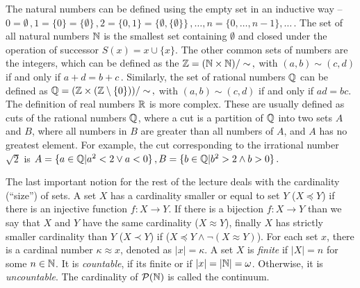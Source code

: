 The natural numbers can be defined using the empty set in an inductive way -- $0 = \emptyset\,,1=\{0\} = \{\emptyset\}\,, 2=\{0,1\} = \{\emptyset, \{\emptyset\}\}\,, \dots, n=\{0, \dots, n-1\}, \dots\,.$ The set of all natural numbers $\mathbb{N}$ is the smallest set containing $\emptyset$ and closed under the operation of successor $S(x) = x \cup \{x\}$. The other common sets of numbers are the integers, which can be defined as the $\mathbb{Z} = (\mathbb{N} \times \mathbb{N})/\sim\,,$ with $(a,b) \sim (c,d)$ if and only if $a + d = b + c\,.$ Similarly, the set of rational numbers $\mathbb{Q}$ can be defined as $\mathbb{Q} = (\mathbb{Z} \times (\mathbb{Z} \setminus \{0\}))/\sim\,,$ with $(a,b) \sim (c,d)$ if and only if $ad=bc$. The definition of real numbers ${\mathbb{R}}$ is more complex. These are usually defined as cuts of the rational numbers $\mathbb{Q}$, where a cut is a partition of $\mathbb{Q}$ into two sets $A$ and $B$, where all numbers in $B$ are greater than all numbers of $A$, and $A$ has no greatest element. For example, the cut corresponding to the irrational number $\sqrt{2}$ is $A = \{a\in \mathbb{Q} | a^2 < 2 \lor a < 0\}\,, B = \{b\in \mathbb{Q} | b^2 > 2 \land b > 0\}\,.$

The last important notion for the rest of the lecture deals with the cardinality (``size'') of sets. A set $X$ has a cardinality smaller or equal to set $Y$ ($X \preceq Y$) if there is an injective function $f: X \to Y$. If there is a bijection $f: X \to Y$ than we say that $X$ and $Y$ have the same cardinality ($X \approx Y$), finally $X$ has strictly smaller cardinality than $Y$ ($X \prec Y$) if ($X \preceq Y \land \neg(X \approx Y)$). For each set $x$, there is a cardinal number $\kappa \approx x$, denoted as $|x| = \kappa$. A set $X$ is \emph{finite} if $|X| = n$ for some $n \in \mathbb{N}$. It is \emph{countable}, if its finite or if $|x| = |\mathbb{N}| = \omega$. Otherwise, it is \emph{uncountable}. The cardinality of $\mathcal{P}(\mathbb{N})$ is called the continuum.

